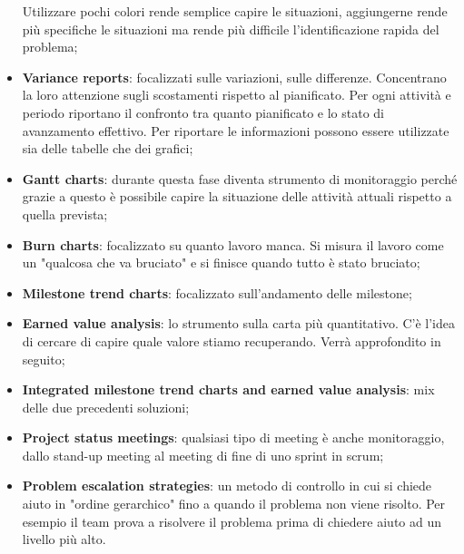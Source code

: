 \begin{itemize}
	Utilizzare pochi colori rende semplice capire le situazioni, aggiungerne rende più specifiche le situazioni ma rende più difficile l'identificazione rapida del problema;
	\item \textbf{Variance reports}: focalizzati sulle variazioni, sulle differenze. Concentrano la loro attenzione sugli scostamenti rispetto al pianificato. Per ogni attività e periodo riportano il confronto tra quanto pianificato e lo stato di avanzamento effettivo. Per riportare le informazioni possono essere utilizzate sia delle tabelle che dei grafici;
	\item \textbf{Gantt charts}: durante questa fase diventa strumento di monitoraggio perché grazie a questo è possibile capire la situazione delle attività attuali rispetto a quella prevista;
	\item \textbf{Burn charts}: focalizzato su quanto lavoro manca. Si misura il lavoro come un "qualcosa che va bruciato" e si finisce quando tutto è stato bruciato;
	\item \textbf{Milestone trend charts}: focalizzato sull'andamento delle milestone;
	\item \textbf{Earned value analysis}: lo strumento sulla carta più quantitativo. C'è l'idea di cercare di capire quale valore stiamo recuperando. Verrà approfondito in seguito;
	\item \textbf{Integrated milestone trend charts and earned value analysis}: mix delle due precedenti soluzioni;
	\item \textbf{Project status meetings}: qualsiasi tipo di meeting è anche monitoraggio, dallo stand-up meeting al meeting di fine di uno sprint in scrum;
	\item \textbf{Problem escalation strategies}: un metodo di controllo in cui si chiede aiuto in "ordine gerarchico" fino a quando il problema non viene risolto. Per esempio il team prova a risolvere il problema prima di chiedere aiuto ad un livello più alto.
\end{itemize}
